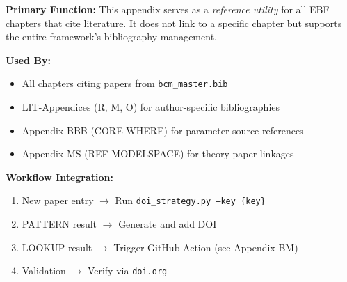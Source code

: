 \begin{tcolorbox}[colback=blue!5, colframe=blue!50, title=Chapter Linkage]
\small
\textbf{Primary Function:} This appendix serves as a \emph{reference utility} for all EBF chapters that cite literature. It does not link to a specific chapter but supports the entire framework's bibliography management.

\textbf{Used By:}
\begin{itemize}[noitemsep]
    \item All chapters citing papers from \texttt{bcm\_master.bib}
    \item LIT-Appendices (R, M, O) for author-specific bibliographies
    \item Appendix BBB (CORE-WHERE) for parameter source references
    \item Appendix MS (REF-MODELSPACE) for theory-paper linkages
\end{itemize}

\textbf{Workflow Integration:}
\begin{enumerate}[noitemsep]
    \item New paper entry $\to$ Run \texttt{doi\_strategy.py --key \{key\}}
    \item PATTERN result $\to$ Generate and add DOI
    \item LOOKUP result $\to$ Trigger GitHub Action (see Appendix BM)
    \item Validation $\to$ Verify via \texttt{doi.org}
\end{enumerate}
\end{tcolorbox}

